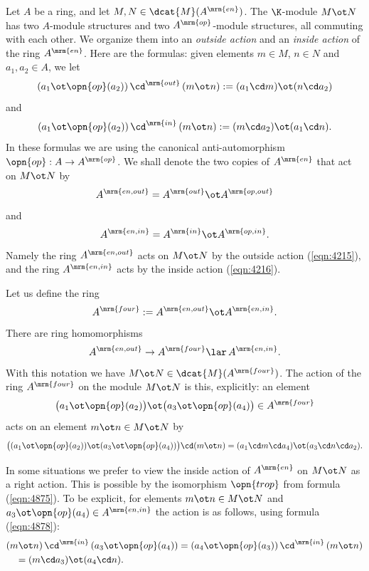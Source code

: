 Let $A$ be a ring, and let 
$M, N \in \dcat{M}(A^{\mrm{en}})$.
The $\K$-module $M \ot N$ has two $A$-module structures and two 
$A^{\mrm{op}}$-module structures, all commuting with each other. 
We organize them into an {\em outside action} and an {\em inside 
action} of the ring $A^{\mrm{en}}$. Here are the formulas: given elements 
$m \in M$, $n \in N$ and $a_1, a_2 \in A$, we let
\begin{equation} \label{eqn:4215}
(a_1 \ot \opn{op}(a_2)) \, \cd^{\mrm{out}} \, (m \ot n) := 
(a_1 \cd m) \ot (n \cd a_2) 
\end{equation}
and
\begin{equation} \label{eqn:4216}
(a_1 \ot \opn{op}(a_2)) \, \cd^{\mrm{in}} \, (m \ot n) := 
(m \cd a_2) \ot (a_1 \cd n) . 
\end{equation}
In these formulas we are using the canonical anti-automorphism
$\opn{op} : A \to A^{\mrm{op}}$. 
We shall denote the two copies 
of $A^{\mrm{en}}$ that act on $M \ot N$ by
\begin{equation} \label{eqn:4460}
A^{\mrm{en, out}} = A^{\mrm{out}} \ot A^{\mrm{op, out}}
\end{equation}
and
\begin{equation} \label{eqn:4461}
A^{\mrm{en, in}} = A^{\mrm{in}} \ot A^{\mrm{op, in}} . 
\end{equation}
Namely the ring $A^{\mrm{en, out}}$ acts on $M \ot N$ by the outside action
(\ref{eqn:4215}), 
and the ring $A^{\mrm{en, in}}$ acts by the inside action (\ref{eqn:4216}). 

Let us define the ring 
\begin{equation} \label{eqn:4411}
A^{\mrm{four}} := A^{\mrm{en, out}} \ot A^{\mrm{en, in}}  .
\end{equation}
There are ring homomorphisms 
\begin{equation} \label{eqn:4500}
A^{\mrm{en, out}} \to A^{\mrm{four}} \lar \, A^{\mrm{en, in}}  .
\end{equation}
With this notation we have 
$M \ot N \in \dcat{M}(A^{\mrm{four}})$.
The action of the ring $A^{\mrm{four}}$ on the module $M \ot N$ is this, 
explicitly:  an element 
\[ \bigl( a_1 \ot \opn{op}(a_2) \bigr) \ot 
\bigl( a_3 \ot \opn{op}(a_4) \bigr) \in A^{\mrm{four}}\]
acts on an element 
$m \ot n \in M \ot N$ by
\[ \bigl( (a_1 \ot \opn{op}(a_2)) \ot (a_3 \ot \opn{op}(a_4)) \bigr) 
\cd (m \ot n) = 
(a_1 \cd m \cd a_4) \ot (a_3 \cd n \cd a_2) . \]

In some situations we prefer to view the inside action of $A^{\mrm{en}}$ on
$M \ot N$ as a right action. This is possible by the isomorphism 
$\opn{trop}$ from formula (\ref{eqn:4875}). 
To be explicit, for elements $m \ot n \in M \ot N$ and 
$a_3 \ot \opn{op}(a_4) \in A^{\mrm{en, in}}$
the action is as follows, using formula (\ref{eqn:4878}):
\begin{equation} \label{eqn:4877}
\begin{aligned}
&
(m \ot n) \, \cd^{\mrm{in}} \, (a_3 \ot \opn{op}(a_4)) = 
(a_4 \ot \opn{op}(a_3))\, \cd^{\mrm{in}} \, (m \ot n)
\\ & \quad 
= (m \cd a_3) \ot (a_4 \cd n) . 
\end{aligned}
\end{equation}

